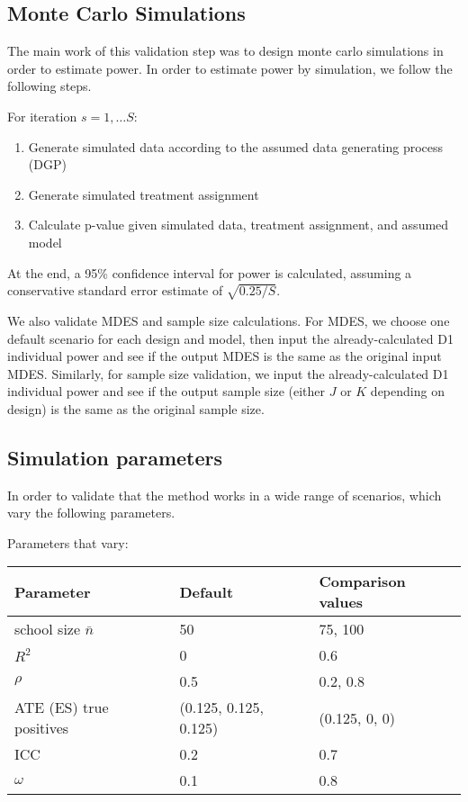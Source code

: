 \documentclass[
]{article}
\providecommand{\tightlist}{%
  \setlength{\itemsep}{0pt}\setlength{\parskip}{0pt}}
\begin{document}
\subsection{Monte Carlo Simulations}

The main work of this validation step was to design monte carlo
simulations in order to estimate power. In order to estimate power by
simulation, we follow the following steps.

For iteration \(s = 1, \dots S\):

\begin{enumerate}
\def\labelenumi{\arabic{enumi}.}
\tightlist
\item
  Generate simulated data according to the assumed data generating
  process (DGP)
\item
  Generate simulated treatment assignment
\item
  Calculate p-value given simulated data, treatment assignment, and
  assumed model
\end{enumerate}

At the end, a 95\% confidence interval for power is calculated, assuming
a conservative standard error estimate of \(\sqrt{0.25/S}\).

We also validate MDES and sample size calculations. For MDES, we choose
one default scenario for each design and model, then input the
already-calculated D1 individual power and see if the output MDES is the
same as the original input MDES. Similarly, for sample size validation,
we input the already-calculated D1 individual power and see if the
output sample size (either \(J\) or \(K\) depending on design) is the
same as the original sample size.

\subsection{Simulation parameters}

In order to validate that the method works in a wide range of scenarios,
which vary the following parameters.

Parameters that vary:

\begin{longtable}[]{@{}lll@{}}
\toprule
Parameter & Default & Comparison values \\
\midrule
\endhead
school size \(\bar{n}\) & 50 & 75, 100 \\
\(R^2\) & 0 & 0.6 \\
\(\rho\) & 0.5 & 0.2, 0.8 \\
ATE (ES) true positives & (0.125, 0.125, 0.125) & (0.125, 0, 0) \\
ICC & 0.2 & 0.7 \\
\(\omega\) & 0.1 & 0.8 \\
\bottomrule
\end{longtable}
\end{document}
